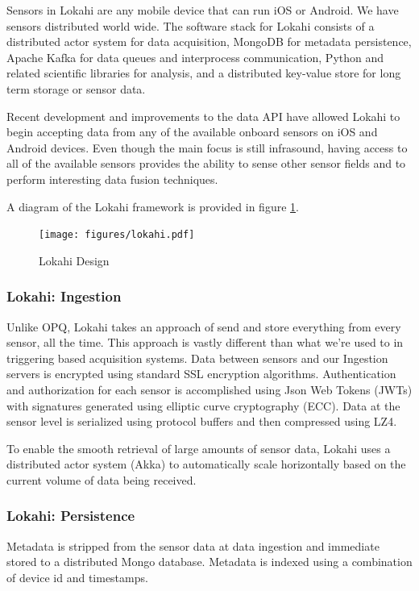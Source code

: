 Sensors in Lokahi are any mobile device that can run iOS or Android. We have sensors distributed world wide. The software stack for Lokahi consists of a distributed actor system for data acquisition, MongoDB for metadata persistence, Apache Kafka for data queues and interprocess communication, Python and related scientific libraries for analysis, and a distributed key-value store for long term storage or sensor data.

Recent development and improvements to the data API have allowed Lokahi to begin accepting data from any of the available onboard sensors on iOS and Android devices. Even though the main focus is still infrasound, having access to all of the available sensors provides the ability to sense other sensor fields and to perform interesting data fusion techniques. 

A diagram of the Lokahi framework is provided in figure \ref{fig:lokahi}.


\begin{figure}
	\centering
	\texttt{[image: figures/lokahi.pdf]}
	\caption{Lokahi Design}\label{fig:lokahi}
\end{figure}

\subsubsection{Lokahi: Ingestion}
Unlike OPQ, Lokahi takes an approach of send and store everything from every sensor, all the time. This approach is vastly different than what we're used to in triggering based acquisition systems. Data between sensors and our Ingestion servers is encrypted using standard SSL encryption algorithms. Authentication and authorization for each sensor is accomplished using Json Web Tokens (JWTs) with signatures generated using elliptic curve cryptography (ECC). Data at the sensor level is serialized using protocol buffers and then compressed using LZ4. 

To enable the smooth retrieval of large amounts of sensor data, Lokahi uses a distributed actor system (Akka) to automatically scale horizontally based on the current volume of data being received. 

\subsubsection{Lokahi: Persistence}
Metadata is stripped from the sensor data at data ingestion and immediate stored to a distributed Mongo database. Metadata is indexed using a combination of device id and timestamps. 

